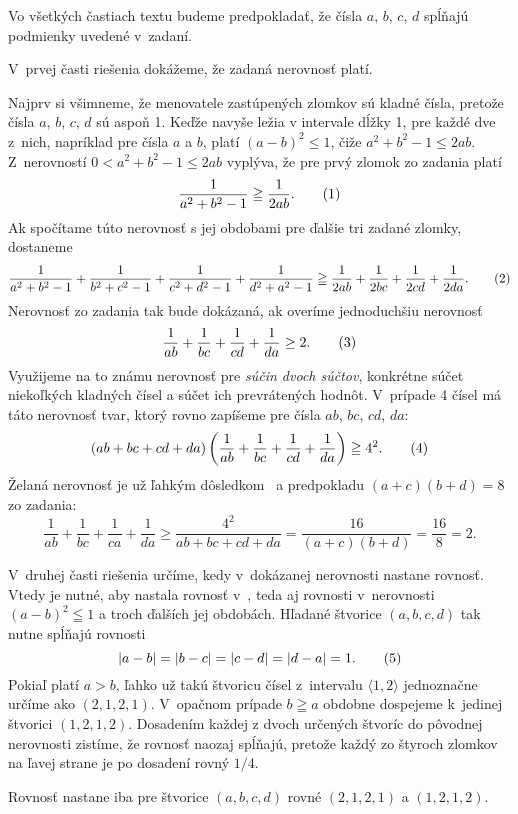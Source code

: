 {%
Vo všetkých častiach textu budeme predpokladať, že čísla
$a$, $b$, $c$, $d$ spĺňajú podmienky uvedené v~zadaní.

\smallskip
V~prvej časti riešenia dokážeme, že zadaná nerovnosť platí.

Najprv si všimneme, že menovatele zastúpených zlomkov
sú kladné čísla, pretože čísla $a$, $b$, $c$, $d$ sú aspoň 1.
Keďže navyše ležia v intervale dĺžky 1, pre každé dve z~nich, napríklad
pre čísla $a$ a $b$, platí $(a-b)^2 \leq 1$, čiže $a^2+b^2-1 \leq
2ab$. Z~nerovností $0<a^2+b^2-1 \leq 2ab$ vyplýva,
že pre prvý zlomok zo zadania platí
$$
\frac{1}{a^2+b^2-1}\geqq\frac{1}{2ab}.
\tag1
$$
Ak spočítame túto nerovnosť s jej obdobami pre ďalšie tri
zadané zlomky, dostaneme
$$
\frac{1}{a^2+b^2-1}+\frac{1}{b^2+c^2-1}+\frac{1}{c^2+d^2-1}
+\frac{1}{d^2+a^2-1}\geqq
\frac{1}{2ab}+\frac{1}{2bc}+\frac{1}{2cd}+\frac{1}{2da}.
\tag2
$$
Nerovnosť zo zadania tak bude dokázaná, ak overíme jednoduchšiu
nerovnosť
$$
\frac{1}{ab}+\frac{1}{bc}+\frac{1}{cd}+\frac{1}{da} \geq 2.
\tag3
$$
Využijeme na to známu nerovnosť pre {\it súčin dvoch súčtov},
konkrétne súčet niekoľkých kladných čísel
a súčet ich prevrátených hodnôt.
V~prípade 4 čísel má táto nerovnosť tvar, ktorý rovno zapíšeme pre
čísla
$ab$, $bc$, $cd$, $da$:
$$
(ab+bc+cd+da)\left(\frac{1}{ab} + \frac{1}{bc}
+ \frac{1}{cd} + \frac{1}{da} \right)\geqq 4^2.
\tag4
$$
Želaná nerovnosť  je už ľahkým dôsledkom~ a
predpokladu $(a+c)(b+d)=8$ zo zadania:
$$
\frac{1}{ab}+\frac{1}{bc}+\frac{1}{ca}+\frac{1}{da} \geq
\frac{4^2}{ab+bc+cd+da} =
\frac{16}{(a+c)(b+d)}=\frac{16}{8}=2.
$$

V~druhej časti riešenia určíme, kedy v~dokázanej nerovnosti
nastane rovnosť. Vtedy je nutné, aby nastala rovnosť v~, teda
aj rovnosti v~nerovnosti $(a-b)^2\leqq1$ a
troch ďalších jej obdobách. Hľadané štvorice $(a,b,c,d)$
tak nutne spĺňajú rovnosti
$$
|a-b|=|b-c|=|c-d|=|d-a|=1.
\tag5
$$
Pokiaľ platí $a>b$, ľahko už takú štvoricu čísel z~intervalu
$\langle 1, 2 \rangle$ jednoznačne určíme ako $(2, 1, 2, 1)$.
V~opačnom prípade $b\geqq a$ obdobne dospejeme k~jedinej
štvorici $(1, 2, 1, 2)$. Dosadením každej z dvoch určených štvoríc
do pôvodnej nerovnosti zistíme, že rovnosť naozaj spĺňajú, pretože
každý zo štyroch zlomkov na ľavej strane je po dosadení rovný $1/4$.

\zaver
Rovnosť nastane iba pre štvorice $(a,b,c,d)$ rovné
$(2, 1, 2, 1)$ a $(1, 2, 1, 2)$.

}
